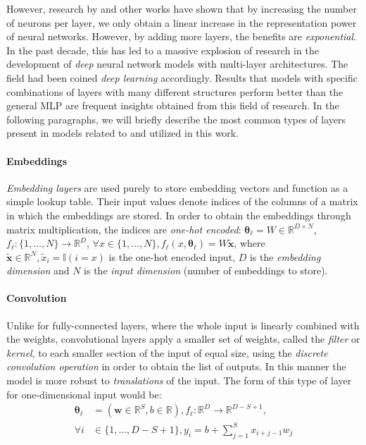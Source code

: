 However, research by \cite{telgarsky_representation_2015, telgarsky_benefits_2016} and other works have shown that by increasing the number of neurons per layer, we only obtain a linear increase in the representation power of neural networks. However, by adding more layers, the benefits are \emph{exponential}. In the past decade, this has led to a massive explosion of research in the development of \emph{deep} neural network models with multi-layer architectures. The field had been coined \emph{deep learning} accordingly. Results that models with specific combinations of layers with many different structures perform better than the general MLP are frequent insights obtained from this field of research. In the following paragraphs, we will briefly describe the most common types of layers present in models related to and utilized in this work.

\paragraph{Embeddings} \emph{Embedding layers} are used purely to store embedding vectors and function as a simple lookup table. Their input values denote indices of the columns of a matrix in which the embeddings are stored. In order to obtain the embeddings through matrix multiplication, the indices are \emph{one-hot encoded}: $\pmb{\theta}_{\ell} = W \in \mathbb{R}^{D \times N}$, $f_{\ell}: \{1,\dots,N\} \to \mathbb{R}^D$, $\forall x \in \{1,\dots,N\}, f_{\ell}(x, \pmb{\theta}_{\ell}) = W \tilde{\pmb{x}}$, where $\tilde{\pmb{x}} \in \mathbb{R}^N, \tilde{x}_i = \mathbb{I}(i = x)$ is the one-hot encoded input, $D$ is the \emph{embedding dimension} and $N$ is the \emph{input dimension} (number of embeddings to store).

\paragraph{Convolution} Unlike for fully-connected layers, where the whole input is linearly combined with the weights, convolutional layers apply a smaller set of weights, called the \emph{filter} or \emph{kernel}, to each smaller section of the input of equal size, using the \emph{discrete convolution operation} in order to obtain the list of outputs. In this manner the model is more robust to \emph{translations} of the input. The form of this type of layer for one-dimensional input would be: 
\begin{align}
\pmb{\theta}_{\ell} &= (\pmb{w} \in \mathbb{R}^{S}, b \in \mathbb{R}), f_{\ell}: \mathbb{R}^{D} \to \mathbb{R}^{D-S+1}, \nonumber \\
\forall i &\in \{1,\dots,D-S+1\}, y_i = b + \sum_{j=1}^{S}{x_{i+j-1}w_j}    
\end{align}

